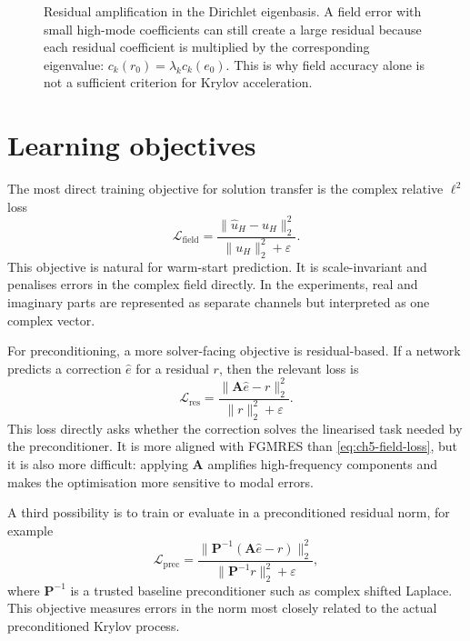 \begin{figure}[htbp]
    \centering
    \caption{Residual amplification in the Dirichlet eigenbasis. A field error
    with small high-mode coefficients can still create a large residual because
    each residual coefficient is multiplied by the corresponding eigenvalue:
    $c_k(r_0)=\lambda_k c_k(e_0)$. This is why field accuracy alone is not a
    sufficient criterion for Krylov acceleration.}
    \label{fig:ch5-modal-amplification-cartoon}
\end{figure}

\section{Learning objectives}
\label{sec:ch5-learning-objectives}

The most direct training objective for solution transfer is the complex
relative $\ell^2$ loss
\begin{equation}
    \mathcal{L}_{\mathrm{field}}
    =
    \frac{\|\hat{u}_H-u_H\|_2^2}
         {\|u_H\|_2^2+\varepsilon}.
    \label{eq:ch5-field-loss}
\end{equation}
This objective is natural for warm-start prediction. It is scale-invariant and
penalises errors in the complex field directly. In the experiments, real and
imaginary parts are represented as separate channels but interpreted as one
complex vector.

For preconditioning, a more solver-facing objective is residual-based. If a
network predicts a correction $\hat{e}$ for a residual $r$, then the relevant
loss is
\begin{equation}
    \mathcal{L}_{\mathrm{res}}
    =
    \frac{\|\mathbf{A}\hat{e}-r\|_2^2}
         {\|r\|_2^2+\varepsilon}.
    \label{eq:ch5-residual-loss}
\end{equation}
This loss directly asks whether the correction solves the linearised task
needed by the preconditioner. It is more aligned with FGMRES than
\eqref{eq:ch5-field-loss}, but it is also more difficult: applying
$\mathbf{A}$ amplifies high-frequency components and makes the optimisation
more sensitive to modal errors.

A third possibility is to train or evaluate in a preconditioned residual norm,
for example
\begin{equation}
    \mathcal{L}_{\mathrm{prec}}
    =
    \frac{\|\mathbf{P}^{-1}(\mathbf{A}\hat{e}-r)\|_2^2}
         {\|\mathbf{P}^{-1}r\|_2^2+\varepsilon},
    \label{eq:ch5-preconditioned-residual-loss}
\end{equation}
where $\mathbf{P}^{-1}$ is a trusted baseline preconditioner such as complex
shifted Laplace. This objective measures errors in the norm most closely
related to the actual preconditioned Krylov process.

